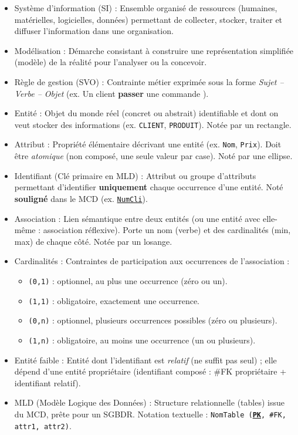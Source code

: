 \documentclass[11pt]{article}
\newcommand{\cle}[1]{{\popxbold\color{popdark}#1}}
\newcounter{popsec}
\newcounter{popsub}
\newcommand{\courssub}[1]{%
  \stepcounter{popsub}%
  \par\vspace{9pt}\noindent{\popxbold\fontsize{11.5}{13}\selectfont\color{popink}{\color{poporange}\thepopsec.\thepopsub}\hspace{6pt}#1}\par\nopagebreak\vspace{4pt}
}
\begin{document}
\courssub{Bilan synthétique}

\begin{definition}
\begin{itemize}
    \item \cle{Système d'information (SI)} : Ensemble organisé de ressources (humaines, matérielles, logicielles, données) permettant de collecter, stocker, traiter et diffuser l'information dans une organisation.
    \item \cle{Modélisation} : Démarche consistant à construire une représentation simplifiée (modèle) de la réalité pour l'analyser ou la concevoir.
    \item \cle{Règle de gestion (SVO)} : Contrainte métier exprimée sous la forme \emph{Sujet -- Verbe -- Objet} (ex. \og Un client \textbf{passer} une commande \fg).
    \item \cle{Entité} : Objet du monde réel (concret ou abstrait) identifiable et dont on veut stocker des informations (ex. \texttt{CLIENT}, \texttt{PRODUIT}). Notée par un rectangle.
    \item \cle{Attribut} : Propriété élémentaire décrivant une entité (ex. \texttt{Nom}, \texttt{Prix}). Doit être \emph{atomique} (non composé, une seule valeur par case). Noté par une ellipse.
    \item \cle{Identifiant (Clé primaire en MLD)} : Attribut ou groupe d'attributs permettant d'identifier \textbf{uniquement} chaque occurrence d'une entité. Noté \textbf{souligné} dans le MCD (ex. \texttt{\underline{NumCli}}).
    \item \cle{Association} : Lien sémantique entre deux entités (ou une entité avec elle-même : association réflexive). Porte un nom (verbe) et des \cle{cardinalités} (min, max) de chaque côté. Notée par un losange.
    \item \cle{Cardinalités} : Contraintes de participation aux occurrences de l'association :
        \begin{itemize}
            \item \texttt{(0,1)} : optionnel, au plus une occurrence (zéro ou un).
            \item \texttt{(1,1)} : obligatoire, exactement une occurrence.
            \item \texttt{(0,n)} : optionnel, plusieurs occurrences possibles (zéro ou plusieurs).
            \item \texttt{(1,n)} : obligatoire, au moins une occurrence (un ou plusieurs).
        \end{itemize}
    \item \cle{Entité faible} : Entité dont l'identifiant est \emph{relatif} (ne suffit pas seul) ; elle dépend d'une entité propriétaire (identifiant composé : \#FK propriétaire + identifiant relatif).
    \item \cle{MLD (Modèle Logique des Données)} : Structure relationnelle (tables) issue du MCD, prête pour un SGBDR. Notation textuelle : \texttt{NomTable (\textbf{\underline{PK}}, \#FK, attr1, attr2)}.
\end{itemize}
\end{definition}
\end{document}

